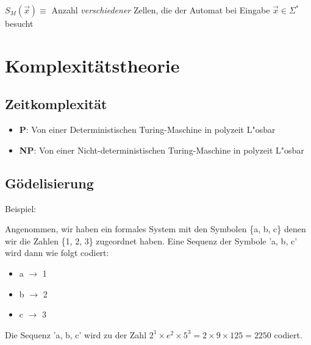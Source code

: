 \documentclass[11pt, a4paper]{scrartcl}
\begin{document}
$S_M(\vec{x}) \equiv$ Anzahl \textit{verschiedener} Zellen, die der Automat bei Eingabe $\vec{x} \in \Sigma^*$ besucht


\section{Komplexitätstheorie}

\subsection{Zeitkomplexität}

\begin{itemize}
    \item \textbf{P}: Von einer Deterministischen Turing-Maschine in polyzeit L"osbar
    \item \textbf{NP}: Von einer Nicht-deterministischen Turing-Maschine in polyzeit L"osbar
\end{itemize}


\subsection{Gödelisierung}

Beispiel:

Angenommen, wir haben ein formales System mit den Symbolen \{a, b, c\} denen wir die Zahlen \{1, 2, 3\} zugeordnet haben. Eine Sequenz der Symbole 'a, b, c' wird dann wie folgt codiert:

\begin{itemize}
    \item a $\rightarrow$ 1
    \item b $\rightarrow$ 2
    \item c $\rightarrow$ 3
\end{itemize}

Die Sequenz 'a, b, c' wird zu der Zahl $2^1 \times e^2 \times 5^3 = 2 \times 9 \times 125 = 2250$ codiert.
\end{document}
